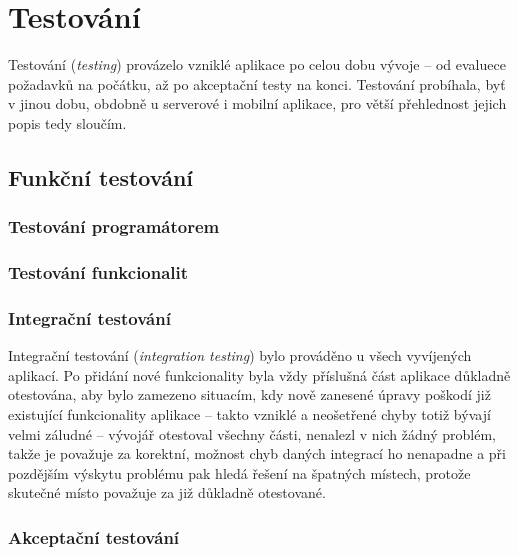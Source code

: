 
\chapter{Testování}
Testování (\textit{testing}) provázelo vzniklé aplikace po celou dobu vývoje -- od evaluece požadavků na počátku, až po akceptační testy na konci. Testování probíhala, byť v jinou dobu, obdobně u serverové i mobilní aplikace, pro větší přehlednost jejich popis tedy sloučím.

\section{Funkční testování}

\subsection{Testování programátorem}


\subsection{Testování funkcionalit}

\subsection{Integrační testování}
Integrační testování (\textit{integration testing}) bylo prováděno u všech vyvíjených aplikací. Po přidání nové funkcionality byla vždy příslušná část aplikace důkladně otestována, aby bylo zamezeno situacím, kdy nově zanesené úpravy poškodí již existující funkcionality aplikace -- takto vzniklé a neošetřené chyby totiž bývají velmi záludné -- vývojář otestoval všechny části, nenalezl v nich žádný problém, takže je považuje za korektní, možnost chyb daných integrací ho nenapadne a při pozdějším výskytu problému pak hledá řešení na špatných místech, protože skutečné místo považuje za již důkladně otestované.

\subsection{Akceptační testování}

